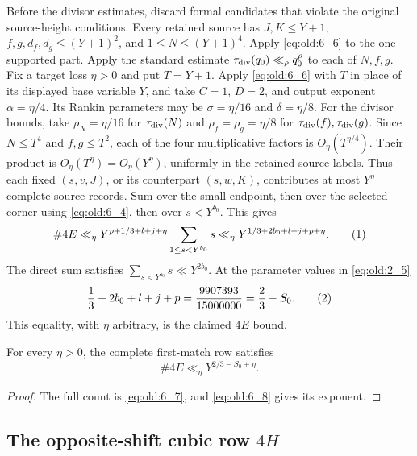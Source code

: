 Before the divisor estimates, discard formal candidates that violate the
original source-height conditions.  Every retained source has
$J,K\le Y+1$, $f,g,d_f,d_g\le(Y+1)^2$, and
$1\le N\le(Y+1)^4$.  Apply \eqref{eq:old:6_6} to the one supported part.
Apply the standard estimate $\tau_{\mathrm{div}}(q_0)\ll_\rho q_0^\rho$ to each of $N,f,g$.
Fix a target loss $\eta>0$ and put $T=Y+1$. Apply \eqref{eq:old:6_6}
with $T$ in place of its displayed base variable $Y$, and take
$C=1$, $D=2$, and output exponent $\alpha=\eta/4$.  Its Rankin
parameters may be $\sigma=\eta/16$ and $\delta=\eta/8$.  For the divisor
bounds, take $\rho_N=\eta/16$ for $\tau_{\mathrm{div}}(N)$ and
$\rho_f=\rho_g=\eta/8$ for $\tau_{\mathrm{div}}(f),\tau_{\mathrm{div}}(g)$.  Since
$N\le T^4$ and $f,g\le T^2$, each of the four multiplicative factors is
$O_\eta(T^{\eta/4})$.  Their product is
$O_\eta(T^\eta)=O_\eta(Y^\eta)$, uniformly in the retained source
labels.  Thus each fixed $(s,v,J)$, or its counterpart $(s,w,K)$,
contributes at most $Y^\eta$ complete source records.  Sum over the small
endpoint, then over the selected corner using \eqref{eq:old:6_4}, then over
$s<Y^{b_0}$.  This gives
\[
 \#4E\ll_\eta
 Y^{p+1/3+l+j+\eta}\sum_{1\le s<Y^{b_0}}s
 \ll_\eta Y^{1/3+2b_0+l+j+p+\eta}.
\AutoTag{eq:old:6_7}
\]
The direct sum satisfies $\sum_{s<Y^{b_0}}s\ll Y^{2b_0}$.  At the parameter
values in \eqref{eq:old:2_5}
\[
 \frac13+2b_0+l+j+p=\frac{9907393}{15000000}=\frac23-S_0.
\AutoTag{eq:old:6_8}
\]
This equality, with $\eta$ arbitrary, is the claimed $4E$ bound.
\begin{rowproposition}\label{prop:row-4e}
For every \(\eta>0\), the complete first-match row satisfies
\[
 \#4E\ll_\eta Y^{2/3-S_0+\eta}.
\]
\end{rowproposition}
\begin{proof}
The full count is \eqref{eq:old:6_7}, and \eqref{eq:old:6_8} gives its exponent.
\end{proof}

\subsection{The opposite-shift cubic row $4H$}

